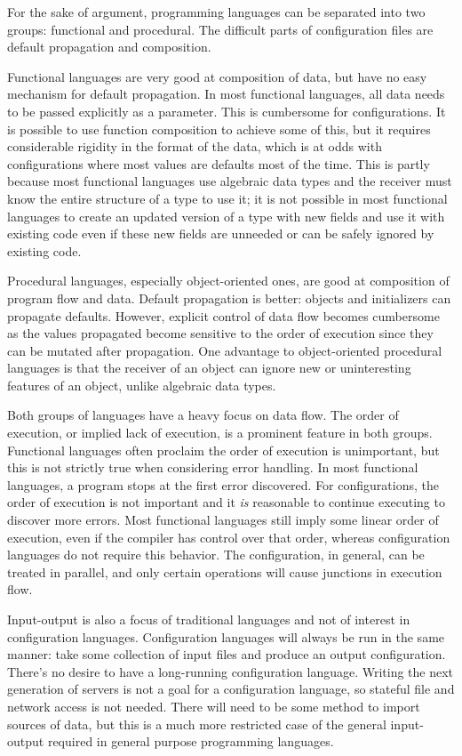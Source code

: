\documentclass[letterpaper,twocolumn,10pt]{article}
\begin{document}
For the sake of argument, programming languages can be separated into two groups: functional and procedural. The difficult parts of configuration files are default propagation and composition.

Functional languages are very good at composition of data, but have no easy mechanism for default propagation. In most functional languages, all data needs to be passed explicitly as a parameter. This is cumbersome for configurations. It is possible to use function composition to achieve some of this, but it requires considerable rigidity in the format of the data, which is at odds with configurations where most values are defaults most of the time. This is partly because most functional languages use algebraic data types and the receiver must know the entire structure of a type to use it; it is not possible in most functional languages to create an updated version of a type with new fields and use it with existing code even if these new fields are unneeded or can be safely ignored by existing code.

Procedural languages, especially object-oriented ones, are good at composition of program flow and data. Default propagation is better: objects and initializers can propagate defaults. However, explicit control of data flow becomes cumbersome as the values propagated become sensitive to the order of execution since they can be mutated after propagation. One advantage to object-oriented procedural languages is that the receiver of an object can ignore new or uninteresting features of an object, unlike algebraic data types.

Both groups of languages have a heavy focus on data flow. The order of execution, or implied lack of execution, is a prominent feature in both groups. Functional languages often proclaim the order of execution is unimportant, but this is not strictly true when considering error handling. In most functional languages, a program stops at the first error discovered. For configurations, the order of execution is not important and it \emph{is} reasonable to continue executing to discover more errors. Most functional languages still imply some linear order of execution, even if the compiler has control over that order, whereas configuration languages do not require this behavior. The configuration, in general, can be treated in parallel, and only certain operations will cause junctions in execution flow.

Input-output is also a focus of traditional languages and not of interest in configuration languages. Configuration languages will always be run in the same manner: take some collection of input files and produce an output configuration. There's no desire to have a long-running configuration language. Writing the next generation of servers is not a goal for a configuration language, so stateful file and network access is not needed. There will need to be some method to import sources of data, but this is a much more restricted case of the general input-output required in general purpose programming languages.
\end{document}
